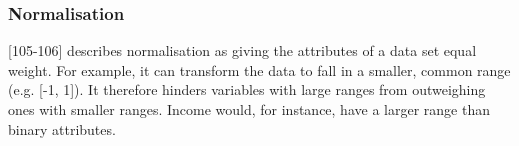
\subsubsection{Normalisation}
\label{section:Normalisation}



\textcite{han2011data}[105-106] describes normalisation as giving the attributes of a data set equal weight. For example, it can transform the data to fall in a smaller, common range (e.g. [-1, 1]). It therefore hinders variables with large ranges from outweighing ones with smaller ranges. Income would, for instance, have a larger range than binary attributes. 

